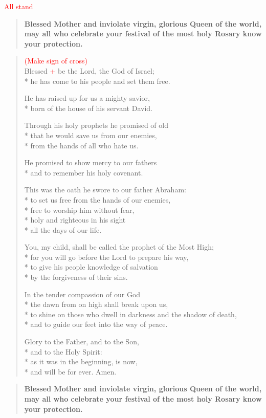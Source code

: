 \documentclass[letterpaper,14pt]{extarticle}
\newcommand{\side}[1]{\flagverse{\textcolor{red}{\textit{#1}}:}}
\newcommand{\rednote}[1]{\textcolor{red}{#1}}
\newlength{\oldindent}
\newcommand{\antiphon}[2]{
	\setlength{\oldindent}{\vindent}
	\setlength{\vindent}{0em}
	\begin{verse}
	\side{#1} \textbf{#2}
	\end{verse}
	\setlength{\vindent}{\oldindent}
}
\begin{document}
\rednote{All stand}
\antiphon{Leader}{Blessed Mother and inviolate virgin, glorious Queen of the world, may all who celebrate your festival of the most holy Rosary know your protection.}
\begin{verse}
\rednote{(Make sign of cross)}\\
\side{All} Blessed \rednote{+} be the Lord, the God of Israel; \\*
he has come to his people and set them free.

He has raised up for us a mighty savior, \\*
born of the house of his servant David.

Through his holy prophets he promised of old \\*
  that he would save us from our enemies, \\*
  from the hands of all who hate us.

He promised to show mercy to our fathers \\*
and to remember his holy covenant.

This was the oath he swore to our father Abraham: \\*
to set us free from the hands of our enemies, \\*
free to worship him without fear, \\*
holy and righteous in his sight \\*
   all the days of our life.

You, my child, shall be called the prophet of the Most High; \\*
for you will go before the Lord to prepare his way, \\*
to give his people knowledge of salvation \\*
by the forgiveness of their sins.

In the tender compassion of our God \\*
the dawn from on high shall break upon us, \\*
to shine on those who dwell in darkness and the shadow of death, \\*
and to guide our feet into the way of peace.

Glory to the Father, and to the Son, \\*
and to the Holy Spirit: \\*
as it was in the beginning, is now, \\*
and will be for ever. Amen.
\end{verse}
\antiphon{All}{Blessed Mother and inviolate virgin, glorious Queen of the world, may all who celebrate your festival of the most holy Rosary know your protection.}
\end{document}
